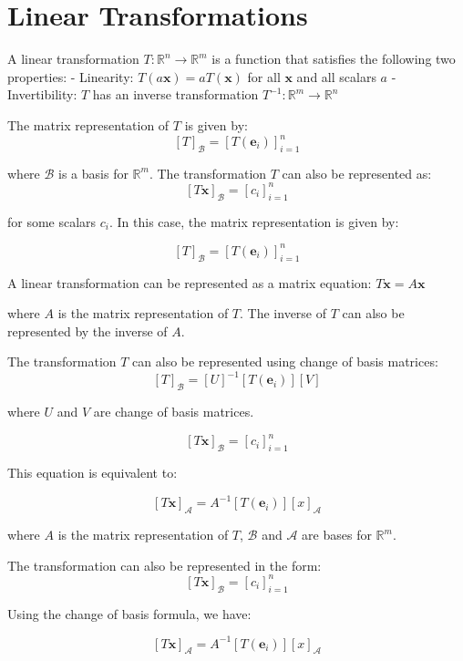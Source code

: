 \section{Linear Transformations}

A linear transformation $T: \mathbb{R}^n \to \mathbb{R}^m$ is a function that satisfies the following two properties:
- Linearity: $T(a \mathbf{x}) = a T(\mathbf{x})$ for all $\mathbf{x}$ and all scalars $a$
- Invertibility: $T$ has an inverse transformation $T^{-1}: \mathbb{R}^m \to \mathbb{R}^n$

The matrix representation of $T$ is given by:
$$
[T]_{\mathcal{B}} = [T(\mathbf{e}_i)]_{i=1}^{n}
$$

where $\mathcal{B}$ is a basis for $\mathbb{R}^m$. The transformation $T$ can also be represented as:
$$
[T \mathbf{x}]_{\mathcal{B}} = [c_i]_{i=1}^{n}
$$

for some scalars $c_i$. In this case, the matrix representation is given by:

$$
[T]_{\mathcal{B}} = [T(\mathbf{e}_i)]_{i=1}^{n}
$$

A linear transformation can be represented as a matrix equation:
$T \mathbf{x} = A \mathbf{x}$

where $A$ is the matrix representation of $T$. The inverse of $T$ can also be represented by the inverse of $A$.

The transformation $T$ can also be represented using change of basis matrices:
$$
[T]_{\mathcal{B}} = [U]^{-1} [T(\mathbf{e}_i)] [V]
$$

where $U$ and $V$ are change of basis matrices. 

$$
[T \mathbf{x}]_{\mathcal{B}} = [c_i]_{i=1}^{n}
$$

This equation is equivalent to:

$$
[T \mathbf{x}]_{\mathcal{A}} = A^{-1} [T(\mathbf{e}_i)] [x]_{\mathcal{A}}
$$

where $A$ is the matrix representation of $T$, $\mathcal{B}$ and $\mathcal{A}$ are bases for $\mathbb{R}^m$. 

The transformation can also be represented in the form:
$$
[T \mathbf{x}]_{\mathcal{B}} = [c_i]_{i=1}^{n}
$$

Using the change of basis formula, we have:

$$
[T \mathbf{x}]_{\mathcal{A}} = A^{-1} [T(\mathbf{e}_i)] [x]_{\mathcal{A}}
$$